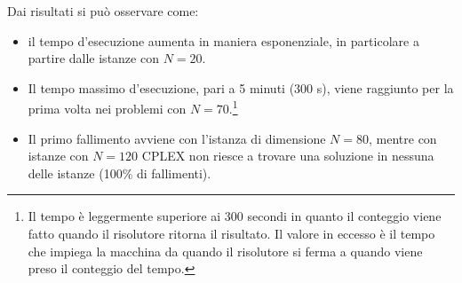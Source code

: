 Dai risultati si può osservare come:
\begin{itemize}
	\item il tempo d'esecuzione aumenta in maniera esponenziale, in particolare a partire dalle istanze con $N=20$.
	\item Il tempo massimo d'esecuzione, pari a 5 minuti (300 s), viene raggiunto per la prima volta
	nei problemi con $N=70$.\footnote{Il tempo è leggermente superiore ai 300 secondi in quanto il conteggio viene fatto
	quando il risolutore ritorna il risultato. Il valore in eccesso è il tempo che impiega la macchina
	da quando il risolutore si ferma a quando viene preso il conteggio del tempo.}
	\item Il primo fallimento avviene con l'istanza di dimensione $N=80$, mentre con istanze con $N=120$ CPLEX
	non riesce a trovare una soluzione in nessuna delle istanze (100\% di fallimenti).
\end{itemize}
%
